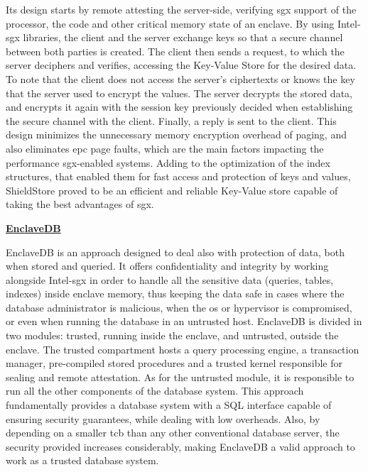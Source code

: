 Its design starts by remote attesting the server-side, verifying \gls{sgx} support of the processor, the code and other critical memory state of an enclave. By using Intel-\gls{sgx} libraries, the client and the server exchange keys so that a secure channel between both parties is created. The client then sends a request, to which the server deciphers and verifies, accessing the Key-Value Store for the desired data. To note that the client does not access the server's ciphertexts or knows the key that the server used to encrypt the values. The server decrypts the stored data, and encrypts it again with the session key previously decided when establishing the secure channel with the client. Finally, a reply is sent to the client.    
This design minimizes the unnecessary memory encryption overhead of paging, and also eliminates \gls{epc} page faults, which are the main factors impacting the performance \gls{sgx}-enabled systems. Adding to the optimization of the index structures, that enabled them for fast access and protection of keys and values, ShieldStore proved to be an efficient and reliable Key-Value store capable of taking the best advantages of \gls{sgx}.\newline


\underline{\textbf{EnclaveDB}}

EnclaveDB \cite{enclavedbPaper} is an approach designed to deal also with protection of data, both when stored and queried. It offers confidentiality and integrity by working alongside Intel-\gls{sgx} in order to handle all the sensitive data (queries, tables, indexes) inside enclave memory, thus keeping the data safe in cases  where the database administrator is malicious, when the \gls{os} or hypervisor is compromised, or even when running the database in an untrusted host. 
EnclaveDB is divided in two modules: trusted, running inside the enclave, and untrusted, outside the enclave. The trusted compartment hosts a query processing engine, a transaction manager, pre-compiled stored procedures and a trusted kernel responsible for sealing and remote attestation. As for the untrusted module, it is responsible to run all the other components of the database system. 
This approach fundamentally provides a database system with a SQL interface capable of ensuring security guarantees, while dealing with low overheads. Also, by depending on a smaller \gls{tcb} than any other conventional database server, the security provided increases considerably, making EnclaveDB a valid approach to work as a trusted database system.




